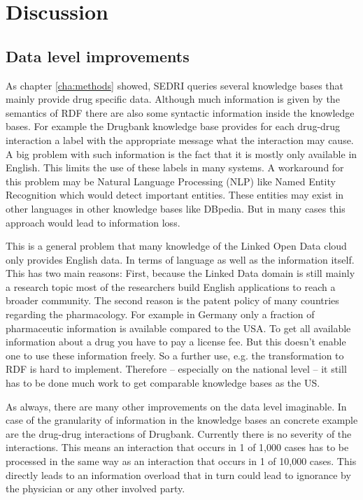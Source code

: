
\chapter{Discussion}
\label{cha:discussion}

\section*{Data level improvements}
\label{sec:impr-data-level}

As chapter \ref{cha:methods} showed, SEDRI queries several knowledge bases that mainly provide drug specific data.
Although much information is given by the semantics of RDF there are also some syntactic information inside the knowledge bases.
For example the Drugbank knowledge base provides for each drug-drug interaction a label with the appropriate message what the interaction may cause.
A big problem with such information is the fact that it is mostly only available in English.
This limits the use of these labels in many systems.
A workaround for this problem may be Natural Language Processing (NLP) like Named Entity Recognition which would detect important entities.
These entities may exist in other languages in other knowledge bases like DBpedia.
But in many cases this approach would lead to information loss.

This is a general problem that many knowledge of the Linked Open Data cloud only provides English data.
In terms of language as well as the information itself.
This has two main reasons:
First, because the Linked Data domain is still mainly a research topic most of the researchers build English applications to reach a broader community.
The second reason is the patent policy of many countries regarding the pharmacology.
For example in Germany only a fraction of pharmaceutic information is available compared to the USA.
To get all available information about a drug you have to pay a license fee.
But this doesn't enable one to use these information freely.
So a further use, e.g. the transformation to RDF is hard to implement.
Therefore -- especially on the national level -- it still has to be done much work to get comparable knowledge bases as the US.

As always, there are many other improvements on the data level imaginable.
In case of the  granularity of information in the knowledge bases an concrete example are the drug-drug interactions of Drugbank.
Currently there is no severity of the interactions.
This means an interaction that occurs in 1 of 1,000 cases has to be processed in the same way as an interaction that occurs in 1 of 10,000 cases.
This directly leads to an information overload that in turn could lead to ignorance by the physician or any other involved party.

